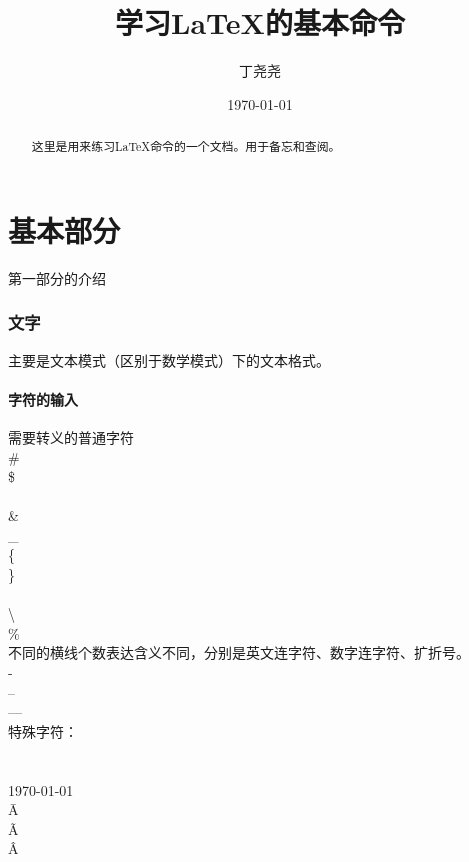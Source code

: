 \documentclass{article}
\author{丁尧尧}
\date{\today}
\title{学习\LaTeX 的基本命令}
\begin{document}
	\maketitle
	\begin{abstract}
		这里是用来练习\LaTeX 命令的一个文档。用于备忘和查阅。
	\end{abstract}
	\setcounter{tocdepth}{2}	
	\tableofcontents
	\part{基本部分}
	第一部分的介绍
		\section{文字}
		主要是文本模式（区别于数学模式）下的文本格式。
			\subsection{字符的输入}
			需要转义的普通字符			\\ 			
			\# 			\\ 
			\$  		\\ 
			\^ 			\\ 
			\& 			\\ 
			\_ 			\\ 
			\{ 			\\ 
			\} 			\\ 
			\~ 			\\
			\textbackslash			\\
			\%			\\
			不同的横线个数表达含义不同，分别是英文连字符、数字连字符、扩折号。 \\
			-			\\
			--			\\
			---			\\
			特殊字符：			\\
			\textcopyright			\\
			\textregistered			\\
			\today			\\
			\={A}			\\
			\~{A}			\\
			\^{A}
\end{document}
